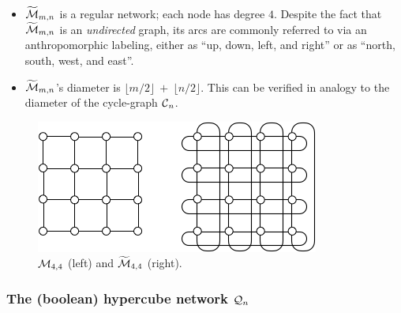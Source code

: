 \begin{itemize}
\begin{itemize}
  \item
$\widetilde{\mbox{$\cal M$}}_{m,n}$ is a regular network; each node has degree $4$.
    Despite the fact that $\widetilde{\mbox{$\cal M$}}_{m,n}$ is an {\em
      undirected} graph, its arcs are commonly referred to via an
    anthropomorphic labeling, either as ``up, down, left, and right''
    or as ``north, south, west, and east''.
  \item {}
$\widetilde{\mbox{$\cal M$}}_{m,n}$'s diameter is $\lfloor m/2 \rfloor \ + \
\lfloor n/2 \rfloor$.  This can be verified in analogy to the diameter
of the cycle-graph $\mbox{$\cal C$}_n$.
\end{itemize}
\end{itemize}

\begin{figure}[hbt]
\begin{center}
       \includegraphics[scale=0.6]{FiguresGraph/meshtorus}
       \caption{$\mbox{$\cal M$}_{4,4}$ (left) and $\widetilde{\mbox{$\cal M$}}_{4,4}$ (right).}
  \label{fig:torus}
\end{center}
\end{figure}



\subsubsection{The (boolean) hypercube network $\mbox{$\cal Q$}_n$}
\label{sec:hypercube}

